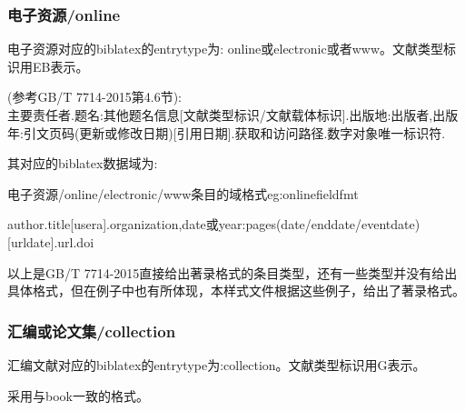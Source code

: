 \subsubsection{电子资源/online}
\begin{refentry}{}{}%
电子资源对应的biblatex的entrytype为: online或electronic或者www。文献类型标识用EB表示。

(参考GB/T 7714-2015第4.6节):\\
主要责任者.题名:其他题名信息[文献类型标识/文献载体标识].出版地:出版者,出版年:引文页码(更新或修改日期)[引用日期].获取和访问路径.数字对象唯一标识符.
\end{refentry}

其对应的biblatex数据域为:
\begin{example}{电子资源/online/electronic/www条目的域格式}{eg:onlinefieldfmt}
\begin{texlist}
author.title[usera].organization,date或year:pages(date/enddate/eventdate)[urldate].url.doi
\end{texlist}
\end{example}


以上是GB/T 7714-2015直接给出著录格式的条目类型，还有一些类型并没有给出具体格式，但在例子中也有所体现，本样式文件根据这些例子，给出了著录格式。

\subsubsection{汇编或论文集/collection}

\begin{refentry}{}{}
汇编文献对应的biblatex的entrytype为:collection。文献类型标识用G表示。

 采用与book一致的格式。
\end{refentry}


